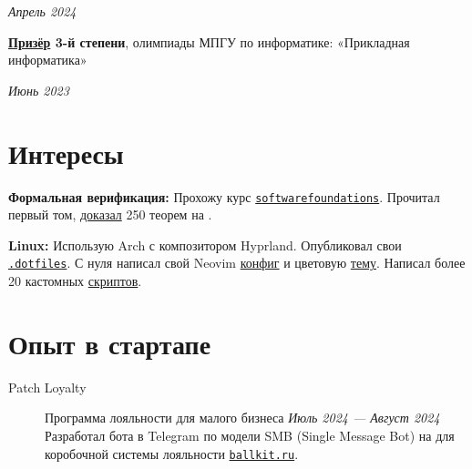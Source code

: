 \documentclass[margin,line]{resume}
\begin{document}
\begin{resume}
  \vspace{-7mm}

  \hfill \textsl{Апрель 2024}

  \textbf{\href{https://github.com/alchemmist/CV/blob/main/attachments/informatics-olimpic.pdf}{Призёр}
  3-й степени}, олимпиады МПГУ по информатике:
  «Прикладная информатика»
  \vspace{-2mm}

  \hfill \textsl{Июнь 2023}
  \vspace{-4mm}
  \section{\mysidestyle Интересы}\vspace{0.7mm}

  {\textbf{Формальная верификация:} Прохожу курс
    \texttt{\href{https://softwarefoundations.cis.upenn.edu}{softwarefoundations}}.
    Прочитал первый том,
    \href{https://github.com/alchemmist/coq-learning}{доказал} 250
  теорем на .} \\

  \vspace{-6mm}

  \textbf{Linux:} Использую Arch с композитором Hyprland. Опубликовал
  свои
  \href{https:/github.com/alchemmist/.dotfiles}{\texttt{.dotfiles}}.
  С нуля написал свой Neovim
  \href{https://github.com/alchemmist/.dotfiles/tree/main/nvim}{конфиг}
  и цветовую
  \href{https://github.com/alchemmist/nothing.nvim}{тему}.
  Написал более 20 кастомных
  \href{https://github.com/alchemmist/.dotfiles/tree/main/scripts}{скриптов}.

  \vfill

  \section{\mysidestyle Опыт в стартапе}\vspace{2mm}

  \begin{description}

    \item[Patch Loyalty]\small Программа лояльности для малого бизнеса \hfill
      \textsl{Июль 2024 — Август 2024\vspace{1mm}}\\
      Разработал бота в Telegram по модели SMB (Single Message Bot) на
       для коробочной системы лояльности
      \href{https://ballkit.ru}{\texttt{ballkit.ru}}.


\end{description}
\end{resume}
\end{document}
